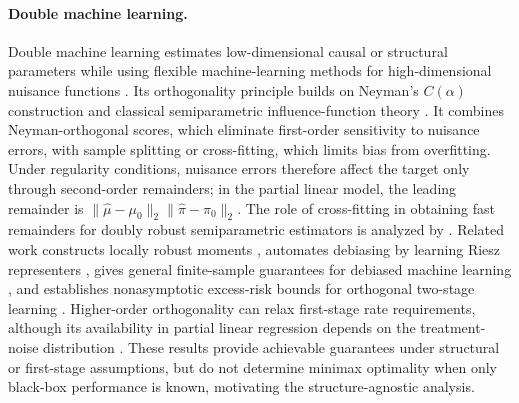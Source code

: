 \documentclass[11pt]{article}
\begin{document}
\paragraph{Double machine learning.}
Double machine learning estimates low-dimensional causal or structural
parameters while using flexible machine-learning methods for high-dimensional
nuisance functions \citep{chernozhukov2018double}. Its orthogonality principle
builds on Neyman's $C(\alpha)$ construction and classical semiparametric
influence-function theory \citep{neyman1959optimal,newey1994asymptotic}. It
combines Neyman-orthogonal scores, which eliminate first-order sensitivity to
nuisance errors, with sample splitting or cross-fitting, which limits bias
from overfitting. Under regularity conditions, nuisance errors therefore
affect the target only through second-order remainders; in the partial linear
model, the leading remainder is
$\|\widehat\mu-\mu_0\|_2\|\widehat\pi-\pi_0\|_2$. The role of cross-fitting in
obtaining fast remainders for doubly robust semiparametric estimators is
analyzed by \citet{newey2018crossfitting}. Related work constructs locally
robust moments \citep{chernozhukov2022locally}, automates debiasing by learning
Riesz representers
\citep{chernozhukov2022automatic,chernozhukov2022riesz}, gives general
finite-sample guarantees for debiased machine learning
\citep{chernozhukov2023simple}, and establishes nonasymptotic excess-risk
bounds for orthogonal two-stage learning
\citep{foster2023orthogonalstatisticallearning}. Higher-order orthogonality can
relax first-stage rate requirements, although its availability in partial
linear regression depends on the treatment-noise distribution
\citep{mackey2018orthogonal}. These results provide achievable guarantees
under structural or first-stage assumptions, but do not determine minimax
optimality when only black-box performance is known, motivating the
structure-agnostic analysis.
\end{document}
